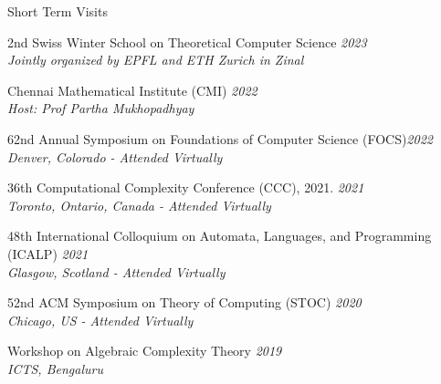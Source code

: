 \documentclass{resume} %
\begin{document}
\begin{rSection}{Short Term Visits}
  \item 2nd Swiss Winter School on Theoretical Computer Science \hfill {\em 2023}
  \\ {\em Jointly organized by EPFL and ETH Zurich in Zinal}

  \item{Chennai Mathematical Institute (CMI)} \hfill {\em 2022}
  \\ {\em Host: Prof Partha Mukhopadhyay}

  \item 62nd Annual Symposium on Foundations of Computer Science (FOCS)\hfill {\em 2022}
  \\ {\em Denver, Colorado - Attended Virtually}

  \item 36th Computational Complexity Conference (CCC), 2021. \hfill {\em  2021}
  \\ {\em Toronto, Ontario, Canada - Attended Virtually}

  \item 48th International Colloquium on Automata, Languages, and Programming (ICALP) \hfill {\em 2021}
  \\ {\em Glasgow, Scotland - Attended Virtually}

  \item 52nd ACM Symposium on Theory of Computing (STOC) \hfill {\em 2020}
  \\ {\em Chicago, US - Attended Virtually}

  \item Workshop on Algebraic Complexity Theory \hfill {\em 2019} \\ {\em ICTS, Bengaluru}

\end{rSection}

\end{document}
